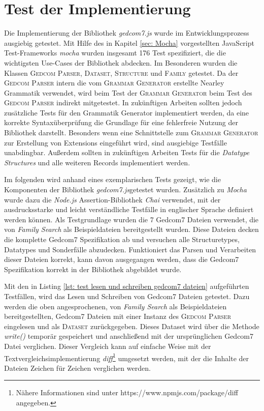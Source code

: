 \section{Test der Implementierung}
Die Implementierung der Bibliothek \textit{gedcom7.js} wurde im Entwicklungsprozess ausgiebig getestet. Mit Hilfe des in Kapitel \ref{sec: Mocha} vorgestellten JavaScript Test-Frameworks \textit{mocha} wurden insgesamt 176 Test spezifiziert, die die wichtigsten Use-Cases der Bibliothek abdecken. Im Besonderen wurden die Klassen \textsc{Gedcom Parser}, \textsc{Dataset}, \textsc{Structure} und \textsc{Family} getestet. Da der \textsc{Gedcom Parser} intern die vom \textsc{Grammar Generator} erstellte Nearley Grammatik verwendet, wird beim Test der \textsc{Grammar Generator} beim Test des \textsc{Gedcom Parser} indirekt mitgetestet. In zukünftigen Arbeiten sollten jedoch zusätzliche Tests für den Grammatik Generator implementiert werden, da eine korrekte Syntaxüberprüfung die Grundlage für eine fehlerfreie Nutzung der Bibliothek darstellt. Besonders wenn eine Schnittstelle zum \textsc{Grammar Generator} zur Erstellung von Extensions eingeführt wird, sind ausgiebige Testfälle unabdingbar. Außerdem sollten in zukünftigen Arbeiten Tests für die \textit{Datatype Structures} und alle weiteren Records implementiert werden. 


Im folgenden wird anhand eines exemplarischen Tests gezeigt, wie die Komponenten der Bibliothek \textit{gedcom7.js}getestet wurden. Zusätzlich zu \textit{Mocha} wurde dazu die \textit{Node.js} Assertion-Bibliothek \textit{Chai} verwendet, mit der ausdrucksstarke und leicht verständliche Testfälle in englischer Sprache definiert werden können. Als Testgrundlage wurden die 7 Gedcom7 Dateien verwendet, die von \textit{Family Search} als Beispieldateien bereitgestellt wurden. Diese Dateien decken die komplette Gedcom7 Spezifikation ab und versuchen alle Structuretypes, Datatypes und Sonderfälle abzudecken. Funktioniert das Parsen und Verarbeiten dieser Dateien korrekt, kann davon ausgegangen werden, dass die Gedcom7 Spezifikation korrekt in der Bibliothek abgebildet wurde.


Mit den in Listing \ref{lst: test lesen und schreiben gedcom7 dateien} aufgeführten Testfällen, wird das Lesen und Schreiben von Gedcom7 Dateien getestet. Dazu werden die oben angesprochenen, von \textit{Family Search} als Beispieldateien bereitgestellten, Gedcom7 Dateien mit einer Instanz des \textsc{Gedcom Parser} eingelesen und als \textsc{Dataset} zurückgegeben. Dieses Dataset wird über die Methode \textit{write()} temporär gespeichert und anschließend mit der ursprünglichen Gedcom7 Datei verglichen. Dieser Vergleich kann auf einfache Weise mit der Textvergleichsimplementierung \textit{diff}\footnote{Nähere Informationen sind unter https://www.npmjs.com/package/diff angegeben.} umgesetzt werden, mit der die Inhalte der Dateien Zeichen für Zeichen verglichen werden. 


